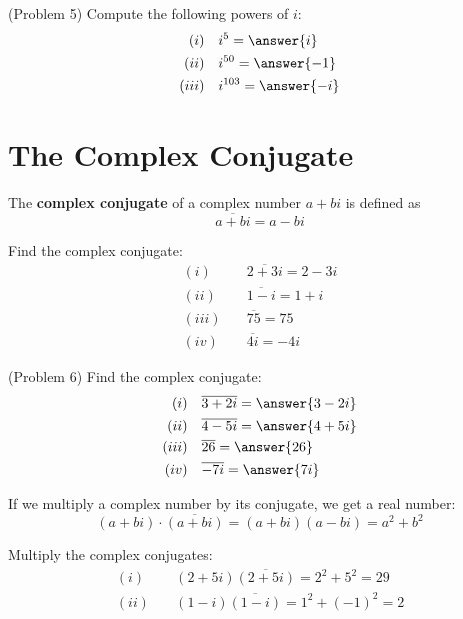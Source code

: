 \documentclass[handout]{ximera}
\begin{document}
\begin{problem}(Problem 5)
Compute the following powers of $i$:
\begin{align*}
(i)& \quad i^5 = \answer{i}\\
(ii)& \quad i^{50} = \answer{-1}\\
(iii)& \quad i^{103}= \answer{-i}
\end{align*}
\end{problem}



\section{The Complex Conjugate}

\begin{definition}
The {\bf complex conjugate} of a complex number $a+bi$ is defined as
\[
\overline {a+bi} = a-bi
\]
\end{definition}

\begin{example}[Example 6]
Find the complex conjugate:
\begin{align*}
(i)& \quad \overline {2+3i} = 2-3i \\
(ii)& \quad \overline {1-i} = 1+i \\
(iii)& \quad \overline {75} = 75 \\
(iv)& \quad \overline {4i} = -4i
\end{align*}
\end{example}


\begin{problem}(Problem 6)
Find the complex conjugate:
\begin{align*}
(i)& \quad {\overline {3+2i}} = \answer{3-2i} \\
(ii)& \quad {\overline {4-5i}} = \answer{4+5i}\\
(iii)& \quad {\overline {26}}= \answer{26}\\
(iv)& \quad {\overline {-7i}}= \answer{7i}
\end{align*}
\end{problem}


If we multiply a complex number by its conjugate, we get a real number:
\[
(a+bi)  \cdot \overline{(a+bi)} = (a+bi)(a-bi) = a^2 +b^2
\]

\begin{example}[Example 7]
Multiply the complex conjugates:
\begin{align*}
(i)& \quad (2+5i) \overline {(2+5i)} = 2^2 + 5^2 = 29\\
(ii)& \quad (1-i) \overline {(1-i)} = 1^2 + (-1)^2 = 2
\end{align*}
\end{example}
\end{document}
